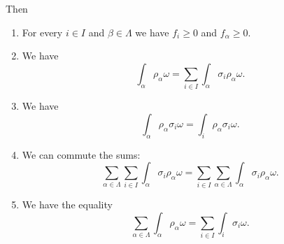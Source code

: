 \begin{proposition}
	Then
	\begin{enumerate}
		\item		\label{ITEMooXJIJooZGNRuU}
		      For every \( i\in I\) and \( \beta\in\Lambda\) we have \( f_i\geq 0\) and \( f_{\alpha}\geq 0\).
		\item		\label{ITEMooLLMCooFGNsYmi}
		      We have
		      \begin{equation}
			      \int_{\alpha}\rho_{\alpha}\omega=\sum_{i\in I}\int_{\alpha}\sigma_i\rho_{\alpha}\omega.
		      \end{equation}
		\item		\label{ITEMooGHRAooYZtFco}
		      We have
		      \begin{equation}
			      \int_{\alpha}\rho_{\alpha}\sigma_i\omega=\int_i\rho_{\alpha}\sigma_i\omega.
		      \end{equation}
		\item		\label{ITEMooJOJPooXfziTe}
		      We can commute the sums:
		      \begin{equation}
			      \sum_{\alpha\in\Lambda}\sum_{i\in I}\int_{\alpha}\sigma_i\rho_{\alpha}\omega=\sum_{i\in I}\sum_{\alpha\in\Lambda}\int_{\alpha}\sigma_i
			      \rho_{\alpha}\omega.
		      \end{equation}
		\item		\label{ITEMooUTQVooHafpOr}
		      We have the equality
		      \begin{equation}
			      \sum_{\alpha\in\Lambda}\int_{\alpha}\rho_{\alpha}\omega=\sum_{i\in I}\int_i\sigma_i\omega.
		      \end{equation}
	\end{enumerate}
\end{proposition}

